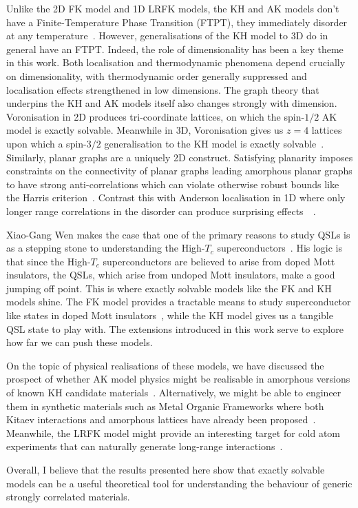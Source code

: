 Unlike the 2D FK model and 1D LRFK models, the KH and AK models don't have a Finite-Temperature Phase Transition (FTPT), they immediately disorder at any temperature~\autocite{eschmannThermodynamicClassificationThreedimensional2020}. However, generalisations of the KH model to 3D do in general have an FTPT. Indeed, the role of dimensionality has been a key theme in this work. Both localisation and thermodynamic phenomena depend crucially on dimensionality, with thermodynamic order generally suppressed and localisation effects strengthened in low dimensions. The graph theory that underpins the KH and AK models itself also changes strongly with dimension. Voronisation in 2D produces tri-coordinate lattices, on which the spin-\(1/2\) AK model is exactly solvable. Meanwhile in 3D, Voronisation gives us \(z=4\) lattices upon which a spin-\(3/2\) generalisation to the KH model is exactly solvable~\autocite{yaoAlgebraicSpinLiquid2009,wenQuantumOrderStringnet2003,ryuThreedimensionalTopologicalPhase2009}. Similarly, planar graphs are a uniquely 2D construct. Satisfying planarity imposes constraints on the connectivity of planar graphs leading amorphous planar graphs to have strong anti-correlations which can violate otherwise robust bounds like the Harris criterion~\autocite{harrisEffectRandomDefects1974}. Contrast this with Anderson localisation in 1D where only longer range correlations in the disorder can produce surprising effects~~\autocite{aubryAnalyticityBreakingAnderson1980,dassarmaLocalizationMobilityEdges1990,dunlapAbsenceLocalizationRandomdimer1990,izrailevLocalizationMobilityEdge1999,croyAndersonLocalization1D2011,izrailevAnomalousLocalizationLowDimensional2012}.

Xiao-Gang Wen makes the case that one of the primary reasons to study QSLs is as a stepping stone to understanding the High-\(T_c\) superconductors~\autocite{wenQuantumOrdersSymmetric2002}. His logic is that since the High-\(T_c\) superconductors are believed to arise from doped Mott insulators, the QSLs, which arise from undoped Mott insulators, make a good jumping off point. This is where exactly solvable models like the FK and KH models shine. The FK model provides a tractable means to study superconductor like states in doped Mott insulators~\autocite{caiVisualizingEvolutionMott2016}, while the KH model gives us a tangible QSL state to play with. The extensions introduced in this work serve to explore how far we can push these models.

On the topic of physical realisations of these models, we have discussed the prospect of whether AK model physics might be realisable in amorphous versions of known KH candidate materials~\autocite{TrebstPhysRep2022}. Alternatively, we might be able to engineer them in synthetic materials such as Metal Organic Frameworks where both Kitaev interactions and amorphous lattices have already been proposed~\autocite{yamadaDesigningKitaevSpin2017,bennett2014amorphous}. Meanwhile, the LRFK model might provide an interesting target for cold atom experiments that can naturally generate long-range interactions~\autocite{lepersLongrangeInteractionsUltracold2017}.

Overall, I believe that the results presented here show that exactly solvable models can be a useful theoretical tool for understanding the behaviour of generic strongly correlated materials.
